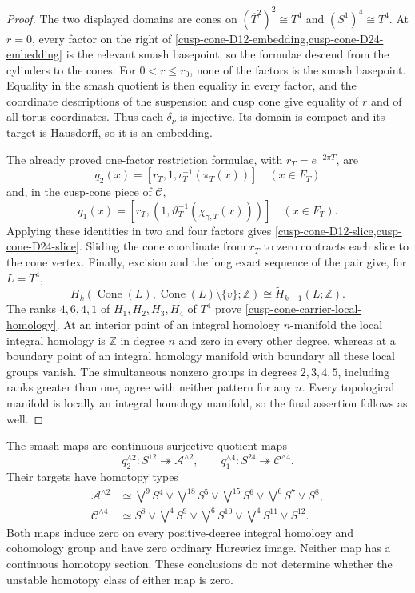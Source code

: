 \begin{proof}
The two displayed domains are cones on
\((\overline T^2)^2\cong T^4\) and \((S^1)^4\cong T^4\).  At \(r=0\),
every factor on the right of
\cref{cusp-cone-D12-embedding,cusp-cone-D24-embedding} is the relevant
smash basepoint, so the formulae descend from the cylinders to the cones.
For \(0<r\leq r_0\), none of the factors is the smash basepoint.  Equality
in the smash quotient is then equality in every factor, and the coordinate
descriptions of the suspension and cusp cone give equality of \(r\) and of
all torus coordinates.  Thus each \(\delta_\nu\) is injective.  Its domain
is compact and its target is Hausdorff, so it is an embedding.

The already proved one-factor restriction formulae, with
\(r_T=e^{-2\pi T}\), are
\[
 q_2(x)=[r_T,1,\iota_T^{-1}(\pi_T(x))]
 \quad(x\in F_T)
\]
and, in the cusp-cone piece of \(\mathcal C\),
\[
 q_1(x)
 =[r_T,(1,\vartheta_T^{-1}(\chi_{\gamma,T}(x)))]
 \quad(x\in F_T).
\]
Applying these identities in two and four factors gives
\cref{cusp-cone-D12-slice,cusp-cone-D24-slice}.  Sliding the cone coordinate
from \(r_T\) to zero contracts each slice to the cone vertex.  Finally,
excision and the long exact sequence of the pair give, for \(L=T^4\),
\[
 H_k(\operatorname{Cone}(L),
     \operatorname{Cone}(L)\setminus\{v\};\mathbb Z)
 \cong\widetilde H_{k-1}(L;\mathbb Z).
\]
The ranks \(4,6,4,1\) of \(H_1,H_2,H_3,H_4\) of \(T^4\) prove
\cref{cusp-cone-carrier-local-homology}.  At an interior point of an
integral homology \(n\)-manifold the local integral homology is \(\mathbb Z\)
in degree \(n\) and zero in every other degree, whereas at a boundary point
of an integral homology manifold with boundary all these local groups
vanish.  The simultaneous nonzero groups in degrees \(2,3,4,5\), including
ranks greater than one, agree with neither pattern for any \(n\).  Every
topological manifold is locally an integral homology manifold, so the final
assertion follows as well.
\end{proof}

\begin{theorem}
\label{cusp-cone-target-homotopy-types}
The smash maps are continuous surjective quotient maps
\[
 q_2^{\wedge2}:S^{12}\twoheadrightarrow\mathcal A^{\wedge2},
 \qquad
 q_1^{\wedge4}:S^{24}\twoheadrightarrow\mathcal C^{\wedge4}.
\]
Their targets have homotopy types
\begin{align}
 \mathcal A^{\wedge2}
 &\simeq
 \bigvee^9S^4\vee\bigvee^{18}S^5\vee
 \bigvee^{15}S^6\vee\bigvee^6S^7\vee S^8,
 \label{cusp-cone-A-smash-wedge}\\
 \mathcal C^{\wedge4}
 &\simeq
 S^8\vee\bigvee^4S^9\vee\bigvee^6S^{10}
 \vee\bigvee^4S^{11}\vee S^{12}.
 \label{cusp-cone-C-smash-wedge}
\end{align}
Both maps induce zero on every positive-degree integral homology and
cohomology group and have zero ordinary Hurewicz image.  Neither map has a
continuous homotopy section.  These conclusions do not determine whether
the unstable homotopy class of either map is zero.
\end{theorem}

